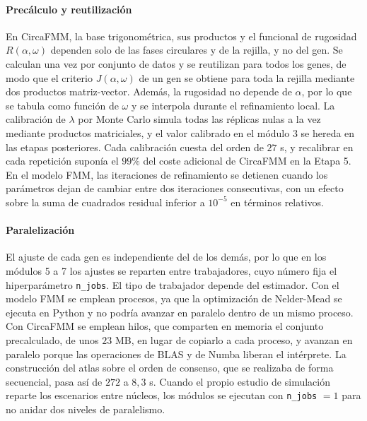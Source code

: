 \documentclass[12pt, a4paper]{report}
\begin{document}
\paragraph{Precálculo y reutilización}
En CircaFMM, la base trigonométrica, sus productos y el funcional de rugosidad \(R(\alpha,\omega)\) dependen solo de las fases circulares y de la rejilla, y no del gen. Se calculan una vez por conjunto de datos y se reutilizan para todos los genes, de modo que el criterio \(J(\alpha,\omega)\) de un gen se obtiene para toda la rejilla mediante dos productos matriz-vector. Además, la rugosidad no depende de \(\alpha\), por lo que se tabula como función de \(\omega\) y se interpola durante el refinamiento local. La calibración de \(\lambda\) por Monte Carlo simula todas las réplicas nulas a la vez mediante productos matriciales, y el valor calibrado en el módulo 3 se hereda en las etapas posteriores. Cada calibración cuesta del orden de \(27\) s, y recalibrar en cada repetición suponía el \(99\%\) del coste adicional de CircaFMM en la Etapa 5. En el modelo FMM, las iteraciones de refinamiento se detienen cuando los parámetros dejan de cambiar entre dos iteraciones consecutivas, con un efecto sobre la suma de cuadrados residual inferior a \(10^{-5}\) en términos relativos.

\paragraph{Paralelización}
El ajuste de cada gen es independiente del de los demás, por lo que en los módulos 5 a 7 los ajustes se reparten entre trabajadores, cuyo número fija el hiperparámetro \texttt{n\_jobs}. El tipo de trabajador depende del estimador. Con el modelo FMM se emplean procesos, ya que la optimización de Nelder-Mead se ejecuta en Python y no podría avanzar en paralelo dentro de un mismo proceso. Con CircaFMM se emplean hilos, que comparten en memoria el conjunto precalculado, de unos \(23\) MB, en lugar de copiarlo a cada proceso, y avanzan en paralelo porque las operaciones de BLAS y de Numba liberan el intérprete. La construcción del atlas sobre el orden de consenso, que se realizaba de forma secuencial, pasa así de \(272\) a \(8{,}3\) s. Cuando el propio estudio de simulación reparte los escenarios entre núcleos, los módulos se ejecutan con \texttt{n\_jobs} \(=1\) para no anidar dos niveles de paralelismo.
\end{document}
